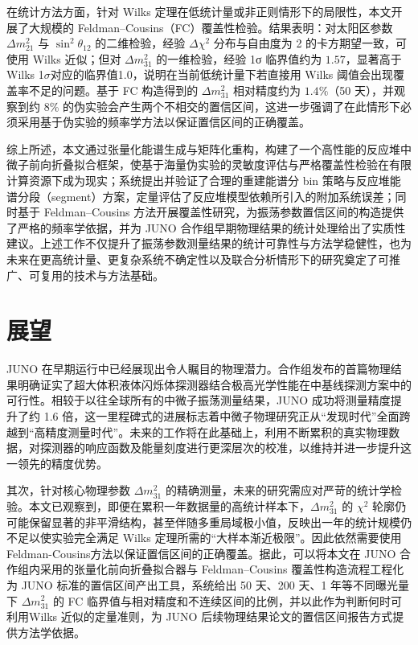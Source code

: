在统计方法方面，针对 Wilks 定理在低统计量或非正则情形下的局限性，本文开展了大规模的 Feldman–Cousins（FC）覆盖性检验。结果表明：对太阳区参数 $\Delta m^2_{21}$ 与 $\sin^2\theta_{12}$ 的二维检验，经验 $\Delta\chi^2$ 分布与自由度为 2 的卡方期望一致，可使用 Wilks 近似；但对 $\Delta m^2_{31}$ 的一维检验，经验 1σ 临界值约为 $1.57$，显著高于 Wilks 1$\sigma$对应的临界值1.0，说明在当前低统计量下若直接用 Wilks 阈值会出现覆盖率不足的问题。基于 FC 构造得到的 $\Delta m^2_{31}$ 相对精度约为 $1.4\%$（50 天），并观察到约 8\% 的伪实验会产生两个不相交的置信区间，这进一步强调了在此情形下必须采用基于伪实验的频率学方法以保证置信区间的正确覆盖。

综上所述，本文通过张量化能谱生成与矩阵化重构，构建了一个高性能的反应堆中微子前向折叠拟合框架，使基于海量伪实验的灵敏度评估与严格覆盖性检验在有限计算资源下成为现实；系统提出并验证了合理的重建能谱分 bin 策略与反应堆能谱分段（segment）方案，定量评估了反应堆模型依赖所引入的附加系统误差；同时基于 Feldman–Cousins 方法开展覆盖性研究，为振荡参数置信区间的构造提供了严格的频率学依据，并为 JUNO 合作组早期物理结果的统计处理给出了实质性建议。上述工作不仅提升了振荡参数测量结果的统计可靠性与方法学稳健性，也为未来在更高统计量、更复杂系统不确定性以及联合分析情形下的研究奠定了可推广、可复用的技术与方法基础。


\section{展望}
\label{sec:outlook}


JUNO 在早期运行中已经展现出令人瞩目的物理潜力。合作组发布的首篇物理结果明确证实了超大体积液体闪烁体探测器结合极高光学性能在中基线探测方案中的可行性。相较于以往全球所有的中微子振荡测量结果，JUNO 成功将测量精度提升了约 1.6 倍，这一里程碑式的进展标志着中微子物理研究正从“发现时代”全面跨越到“高精度测量时代”。未来的工作将在此基础上，利用不断累积的真实物理数据，对探测器的响应函数及能量刻度进行更深层次的校准，以维持并进一步提升这一领先的精度优势。

其次，针对核心物理参数 $\Delta m^2_{31}$ 的精确测量，未来的研究需应对严苛的统计学检验。本文已观察到，即便在累积一年数据量的高统计样本下，$\Delta m^2_{31}$ 的 $\chi^2$ 轮廓仍可能保留显著的非平滑结构，甚至伴随多重局域极小值，反映出一年的统计规模仍不足以使实验完全满足 Wilks 定理所需的“大样本渐近极限”。因此依然需要使用Feldman-Cousins方法以保证置信区间的正确覆盖。据此，可以将本文在 JUNO 合作组内采用的张量化前向折叠拟合器与 Feldman--Cousins 覆盖性构造流程工程化为 JUNO 标准的置信区间产出工具，系统给出 50 天、200 天、1 年等不同曝光量下 $\Delta m^2_{31}$ 的 FC 临界值与相对精度和不连续区间的比例，并以此作为判断何时可利用Wilks 近似的定量准则，为 JUNO 后续物理结果论文的置信区间报告方式提供方法学依据。

